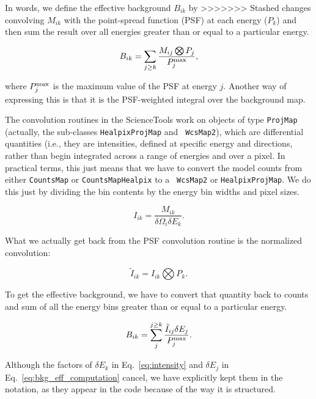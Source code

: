 \documentclass[preprint]{aastex}
\begin{document}
In words, we define the effective background $B_{ik}$ by
>>>>>>> Stashed changes
convolving $M_{ik}$ with the point-spread function (PSF) at each
energy ($P_k$) and then sum the result over all energies greater than or
equal to a particular energy.

\begin{equation}\label{eq:bkg_eff_defintion}
B_{ik} = \sum_{j \ge k} \frac{M_{ij} \bigotimes P_{j}}{P_{j}^{\rm max}}, 
\end{equation}

\noindent where $P_{j}^{\rm max}$ is the maximum value of the PSF at energy $j$.
Another way of expressing this is that it is the PSF-weighted integral over
the background map.  

The convolution routines in the ScienceTools work on objects of type
{\tt ProjMap} (actually, the sub-classes {\tt HealpixProjMap} and {\tt
  WcsMap2}), which are differential quantities (i.e., they are
intensities, defined at specific energy and directions, rather than
begin integrated across a range of energies and over a pixel.  In
practical terms, this just means that we have to convert the model
counts from either {\tt CountsMap} or {\tt CountsMapHealpix} to a {\tt
  WcsMap2} or {\tt HealpixProjMap}.  We do this just by dividing the
bin contents by the energy bin widths and pixel sizes.

\begin{equation}\label{eq:intensity}
I_{ik} = \frac{M_{ik}}{\delta \Omega_i \delta E_k}.
\end{equation}

\noindent What we actually get back from the PSF convolution routine
is the normalized convolution:

\begin{equation}\label{eq:convolved_intensity}
\tilde{I}_{ik} = I_{ik} \bigotimes P_{k}.
\end{equation}

To get the effective background, we have to convert that quantity back
to counts and sum of all the energy bins greater than or equal to a
particular energy.

\begin{equation}\label{eq:bkg_eff_computation}
B_{ik} = \sum_{j}^{j \ge k} \frac{\tilde{I}_{ij} \delta E_j}{P_{j}^{\rm max}}.
\end{equation}

\noindent Although the factors of $\delta E_k$ in Eq.~\ref{eq:intensity}
and $\delta E_j$ in Eq.~\ref{eq:bkg_eff_computation} cancel, we have 
explicitly kept them in the notation, as they appear in the code because
of the way it is structured.
\end{document}
